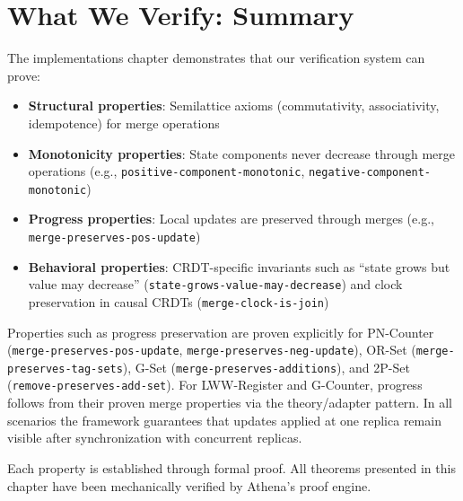 \section{What We Verify: Summary}

The implementations chapter demonstrates that our verification system can prove:

\begin{itemize}
  \item \textbf{Structural properties}: Semilattice axioms (commutativity, associativity, idempotence) for merge operations
  
  \item \textbf{Monotonicity properties}: State components never decrease through merge operations (e.g., \texttt{positive-component-monotonic}, \texttt{negative-component-monotonic})
  
  \item \textbf{Progress properties}: Local updates are preserved through merges (e.g., \texttt{merge-preserves-pos-update})
  
  \item \textbf{Behavioral properties}: CRDT-specific invariants such as ``state grows but value may decrease'' (\texttt{state-grows-value-may-decrease}) and clock preservation in causal CRDTs (\texttt{merge-clock-is-join})
\end{itemize}

 Properties such as progress preservation are proven explicitly for PN-Counter (\texttt{merge-preserves-pos-update}, \texttt{merge-preserves-neg-update}), OR-Set (\texttt{merge-preserves-tag-sets}), G-Set (\texttt{merge-preserves-additions}), and 2P-Set (\texttt{remove-preserves-add-set}). For LWW-Register and G-Counter, progress follows from their proven merge properties via the theory/adapter pattern. In all scenarios the framework guarantees that updates applied at one replica remain visible after synchronization with concurrent replicas.

Each property is established through formal proof. All theorems presented in this chapter have been mechanically verified by Athena's proof engine.
